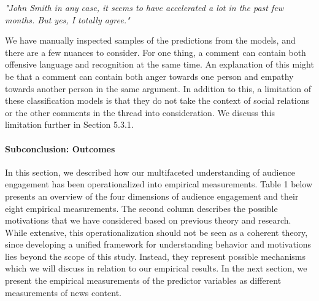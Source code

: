 \documentclass[
]{article}
\begin{document}
\begin{center}
\small
\emph{"John Smith in any case, it seems to have accelerated a lot in the past few months. But yes, I totally agree."}
\end{center}
\normalsize

\noindent We have manually inspected samples of the predictions from the
models, and there are a few nuances to consider. For one thing, a
comment can contain both offensive language and recognition at the same
time. An explanation of this might be that a comment can contain both
anger towards one person and empathy towards another person in the same
argument. In addition to this, a limitation of these classification
models is that they do not take the context of social relations or the
other comments in the thread into consideration. We discuss this
limitation further in Section 5.3.1.

\hypertarget{subconclusion-outcomes}{%
\paragraph*{Subconclusion: Outcomes}\label{subconclusion-outcomes}}

\hspace{-2.5em}

\noindent In this section, we described how our multifaceted
understanding of audience engagement has been operationalized into
empirical measurements. Table 1 below presents an overview of the four
dimensions of audience engagement and their eight empirical
measurements. The second column describes the possible motivations that
we have considered based on previous theory and research. While
extensive, this operationalization should not be seen as a coherent
theory, since developing a unified framework for understanding behavior
and motivations lies beyond the scope of this study. Instead, they
represent possible mechanisms which we will discuss in relation to our
empirical results. In the next section, we present the empirical
measurements of the predictor variables as different measurements of
news content.
\end{document}
